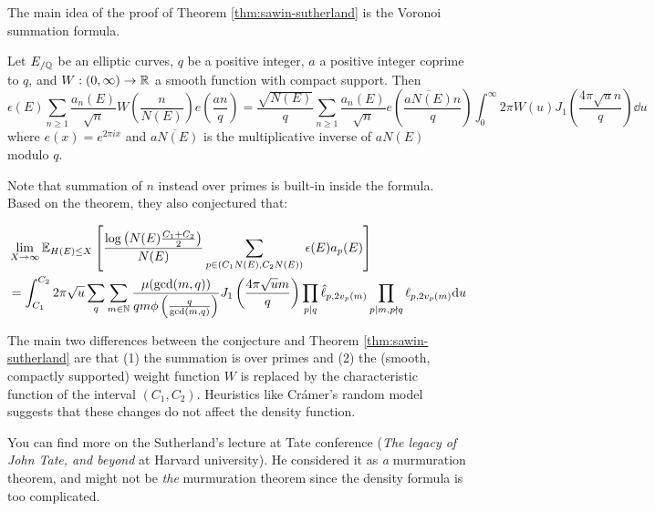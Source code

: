 The main idea of the proof of Theorem \ref{thm:sawin-sutherland} is the Voronoi summation formula.

\begin{theorem}
    Let $E_{/\mathbb{Q}}$ be an elliptic curves, $q$ be a positive integer, $a$ a positive integer coprime to $q$, and $W: (0, \infty) \to \mathbb{R}$ a smooth function with compact support.
    Then
    \begin{equation}
        \epsilon(E) \sum_{n \ge 1} \frac{a_n(E)}{\sqrt{n}} W\left(\frac{n}{N(E)}\right) e\left(\frac{an}{q}\right) = \frac{\sqrt{N(E)}}{q} \sum_{n \ge 1} \frac{a_n(E)}{\sqrt{n}} e\left(\frac{\overline{aN(E)} n}{q}\right) \int_0^{\infty} 2 \pi W(u) J_1\left(\frac{4 \pi \sqrt{u}n}{q}\right) \dd u
    \end{equation}
    where $e(x) = e^{2 \pi i x}$ and $\overline{aN(E)}$ is the multiplicative inverse of $aN(E)$ modulo $q$.
\end{theorem}
Note that summation of $n$ instead over primes is built-in inside the formula.
Based on the theorem, they also conjectured that:

\begin{conjecture}
\begin{align*}
    &\lim_{X \to \infty} \mathbb{E}_{H(E) \le X} \left[\frac{\log\left(N(E) \frac{C_1 + C_2}{2}\right)}{N(E)} \sum_{p \in (C_1 N(E), C_2 N(E))} \epsilon(E) a_p(E)\right] \\
    &= \int_{C_1}^{C_2} 2 \pi \sqrt{u} \sum_{q} \sum_{m \in \mathbb{N}} \frac{\mu(\gcd(m, q))}{qm \phi\left(\frac{q}{\gcd(m, q)}\right)} J_1 \left(\frac{4 \pi \sqrt{u}m}{q}\right) \prod_{p \mid q} \hat{\ell}_{p, 2v_p(m)} \prod_{p \mid m, p \nmid q} \ell_{p, 2v_p(m)} \mathrm{d} u
\end{align*}
\end{conjecture}

The main two differences between the conjecture and Theorem \ref{thm:sawin-sutherland} are that (1) the summation is over primes and (2) the (smooth, compactly supported) weight function $W$ is replaced by the characteristic function of the interval $(C_1, C_2)$.
Heuristics like Cr\'amer's random model suggests that these changes do not affect the density function.

You can find more on the Sutherland's lecture \cite{sutherland} at Tate conference (\emph{The legacy of John Tate, and beyond} at Harvard university).
He considered it as \emph{a} murmuration theorem, and might not be \emph{the} murmuration theorem since the density formula is too complicated.
